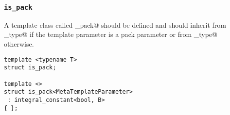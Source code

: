 \subsubsection{\texttt{is\_pack}}

A template class called \verb@is_pack@ should be defined and should
inherit from \verb@true_type@ if the template parameter is a pack
parameter or from \verb@false_type@ otherwise.

\begin{verbatim}
template <typename T>
struct is_pack;

template <>
struct is_pack<MetaTemplateParameter>
 : integral_constant<bool, B>
{ };
\end{verbatim}

